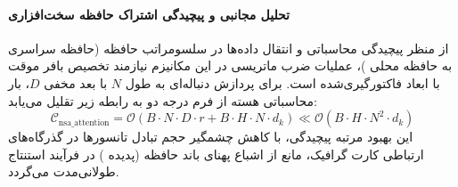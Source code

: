 \paragraph{تحلیل مجانبی و پیچیدگی اشتراک حافظه سخت‌افزاری}
از منظر پیچیدگی محاسباتی و انتقال داده‌ها در سلسومراتب حافظه (حافظه سراسری  به حافظه محلی )، عملیات ضرب ماتریسی در این مکانیزم نیازمند تخصیص بافر موقت با ابعاد فاکتورگیری‌شده است. برای پردازش دنباله‌ای به طول $N$ با بعد مخفی $D$، بار محاسباتی هسته از فرم درجه دو به رابطه زیر تقلیل می‌یابد:
\begin{equation}
\label{eq:complexity_nsa_attention}
\mathcal{C}_{\text{nsa\_attention}} = \mathcal{O}\left( B \cdot N \cdot D \cdot r + B \cdot H \cdot N \cdot d_k \right) \ll \mathcal{O}\left( B \cdot H \cdot N^2 \cdot d_k \right)
\end{equation}
این بهبود مرتبه پیچیدگی، با کاهش چشمگیر حجم تبادل تانسورها در گذرگاه‌های ارتباطی کارت گرافیک، مانع از اشباع پهنای باند حافظه (پدیده ) در فرآیند استنتاج طولانی‌مدت می‌گردد.
